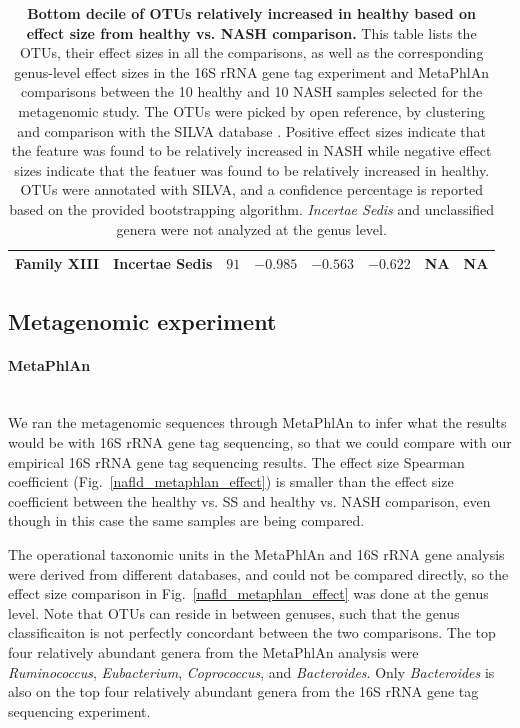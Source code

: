 \begin{table}[!ht]
\begin{tiny}
\begin{tabular}{|l|l|l|l|l|l|l|l|}
Family XIII & Incertae Sedis & $91$ & $-0.985$ & $-0.563$ & $-0.622$ & NA & NA \\ \hline
\end{tabular}
\end{tiny}
\caption[Bottom decile of OTUs relatively increased in healthy based on effect size from healthy vs. NASH comparison.]{ \textbf{Bottom decile of OTUs relatively increased in healthy based on effect size from healthy vs. NASH comparison.} This table lists the OTUs, their effect sizes in all the comparisons, as well as the corresponding genus-level effect sizes in the 16S rRNA gene tag experiment and MetaPhlAn comparisons between the 10 healthy and 10 NASH samples selected for the metagenomic study. The OTUs were picked by open reference, by clustering and comparison with the SILVA database \cite{quast2013silva}. Positive effect sizes indicate that the feature was found to be relatively increased in NASH while negative effect sizes indicate that the featuer was found to be relatively increased in healthy. OTUs were annotated with SILVA, and a confidence percentage is reported based on the provided bootstrapping algorithm. \textit{Incertae Sedis} and unclassified genera were not analyzed at the genus level.}
\label{nafld_bot_otu_table}
\end{table}


\FloatBarrier

\subsection{Metagenomic experiment}

\paragraph{MetaPhlAn}\mbox{}\\

We ran the metagenomic sequences through MetaPhlAn to infer what the results would be with 16S rRNA gene tag sequencing, so that we could compare with our empirical 16S rRNA gene tag sequencing results. The effect size Spearman coefficient (Fig.~\ref{nafld_metaphlan_effect}) is smaller than the effect size coefficient between the healthy vs. SS and healthy vs. NASH comparison, even though in this case the same samples are being compared.

The operational taxonomic units in the MetaPhlAn and 16S rRNA gene analysis were derived from different databases, and could not be compared directly, so the effect size comparison in Fig.~\ref{nafld_metaphlan_effect} was done at the genus level. Note that OTUs can reside in between genuses, such that the genus classificaiton is not perfectly concordant between the two comparisons. The top four relatively abundant genera from the MetaPhlAn analysis were \textit{Ruminococcus}, \textit{Eubacterium}, \textit{Coprococcus}, and \textit{Bacteroides}. Only \textit{Bacteroides} is also on the top four relatively abundant genera from the 16S rRNA gene tag sequencing experiment.

